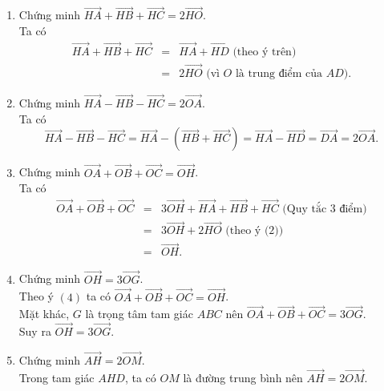 \begin{bt}
{\begin{enumerate}
{
			      }
			\item Chứng minh
			      $\overrightarrow{HA}+\overrightarrow{HB}+\overrightarrow{HC}=2\overrightarrow{HO}$.\\
			      Ta có
			      \allowdisplaybreaks
			      \begin{eqnarray*}
				      \overrightarrow{HA}+\overrightarrow{HB}+\overrightarrow{HC}
				      &=&\overrightarrow{HA}+\overrightarrow{HD}\text{ (theo ý trên)}\\
				      &=&2\overrightarrow{HO} \text{ (vì } O \text{ là trung điểm của } AD).
			      \end{eqnarray*}
			\item Chứng minh  $\overrightarrow{HA}-\overrightarrow{HB}-\overrightarrow{HC}=2\overrightarrow{OA}$.\\
			      Ta có
			      $$\overrightarrow{HA}-\overrightarrow{HB}-\overrightarrow{HC}=\overrightarrow{HA}-\left(\overrightarrow{HB}+\overrightarrow{HC}\right)=\overrightarrow{HA}-\overrightarrow{HD}=\overrightarrow{DA}=2\overrightarrow{OA}.$$
			\item Chứng minh  $\overrightarrow{OA}+\overrightarrow{OB}+\overrightarrow{OC}=\overrightarrow{OH}$.\\
			      Ta có
			      \begin{eqnarray*}
				      \overrightarrow{OA}+\overrightarrow{OB}+\overrightarrow{OC} &=&3\overrightarrow{OH}+\overrightarrow{HA}+\overrightarrow{HB}+\overrightarrow{HC} \text{ (Quy tắc 3 điểm)}\\
				      &=&3\overrightarrow{OH}+2\overrightarrow{HO}\text{ (theo ý (2))}\\
				      &=&\overrightarrow{OH}.
			      \end{eqnarray*}
			\item Chứng minh $\overrightarrow{OH}=3\overrightarrow{OG}$.\\
			      Theo ý $(4)$ ta có $\overrightarrow{OA}+\overrightarrow{OB}+\overrightarrow{OC}=\overrightarrow{OH}$.\\
			      Mặt khác, $G$ là trọng tâm tam giác $ABC$ nên $\overrightarrow{OA}+\overrightarrow{OB}+\overrightarrow{OC}=3\overrightarrow{OG}$.\\
			      Suy ra $\overrightarrow{OH}=3\overrightarrow{OG}$.
			\item Chứng minh $\overrightarrow{AH}=2\overrightarrow{OM}$.\\
			      Trong tam giác $AHD$, ta có $OM$ là đường trung bình nên $\overrightarrow{AH}=2\overrightarrow{OM}$.
		\end{enumerate}}
\end{bt}


